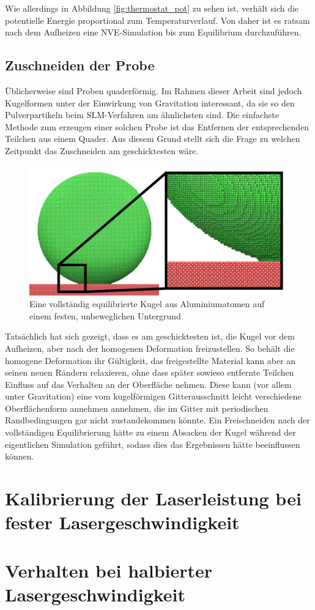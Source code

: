 		Wie allerdings in Abbildung \ref{fig:thermostat_pot} zu sehen ist, verhält sich die
		potentielle Energie proportional zum Temperaturverlauf. Von daher ist es ratsam nach dem
		Aufheizen eine NVE-Simulation bis zum Equilibrium durchzuführen.

	\subsection{Zuschneiden der Probe}
		Üblicherweise sind Proben quaderförmig. Im Rahmen dieser Arbeit sind jedoch Kugelformen
		unter der Einwirkung von Gravitation interessant, da sie so den Pulverpartikeln beim
		SLM-Verfahren am ähnlichsten sind. Die einfachste Methode zum erzeugen einer solchen Probe
		ist das Entfernen der entsprechenden Teilchen aus einem Quader. Aus diesem Grund stellt
		sich die Frage zu welchen Zeitpunkt das Zuschneiden am geschicktesten wäre.

		\begin{figure}[!ht]
			\centering
			\includegraphics[width=\textwidth]{chapter/main/single/img/equilibrated_sphere.zoom.png}
			\caption{Eine vollständig equilibrierte Kugel aus Aluminiumatomen auf einem festen,
			unbeweglichen Untergrund}
			\label{fig:equilibrated_sample}
		\end{figure}

		Tatsächlich hat sich gezeigt, dass es am geschicktesten ist, die Kugel vor dem Aufheizen,
		aber nach der homogenen Deformation freizustellen. So behält die homogene Deformation ihr
		Gültigkeit, das freigestellte Material kann aber an seinen neuen Rändern relaxieren, ohne
		dass später sowieso entfernte Teilchen Einfluss auf das Verhalten an der Oberfläche
		nehmen. Diese kann (vor allem unter Gravitation) eine vom kugelförmigen Gitterausschnitt
		leicht verschiedene Oberflächenform annehmen annehmen, die im Gitter mit periodischen
		Randbedingungen gar nicht zustandekommen könnte. Ein Freischneiden nach der vollständigen
		Equilibrierung hätte zu einem Absacken der Kugel während der eigentlichen Simulation
		geführt, sodass dies das Ergebnissen hätte beeinflussen können.


\section{Kalibrierung der Laserleistung bei fester Lasergeschwindigkeit}

\section{Verhalten bei halbierter Lasergeschwindigkeit}
